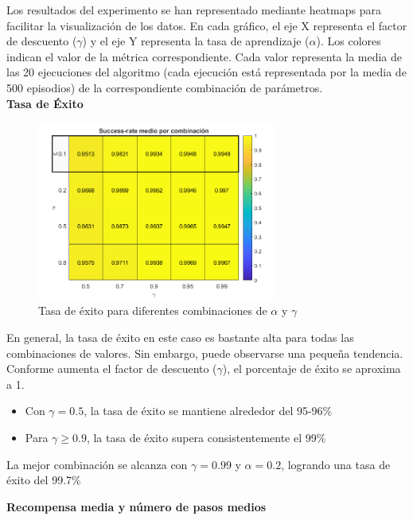 Los resultados del experimento se han representado mediante heatmaps para facilitar la visualización de los datos. En cada gráfico, el eje X representa el factor de descuento ($\gamma$) y el eje Y representa la tasa de aprendizaje ($\alpha$). Los colores indican el valor de la métrica correspondiente. Cada valor representa la media de las 20 ejecuciones del algoritmo (cada ejecución está representada por la media de 500 episodios) de la correspondiente combinación de parámetros. 
\\

\textbf{Tasa de Éxito}

\begin{figure}[H]
    \centering
    \includegraphics[width=0.7\textwidth]{../../experiments/qlearning/experiment-1/results/success.png}
    \caption{Tasa de éxito para diferentes combinaciones de $\alpha$ y $\gamma$}
    \label{fig:qlearning-success}
\end{figure}

En general, la tasa de éxito en este caso es bastante alta para todas las combinaciones de valores. Sin embargo, puede observarse una pequeña tendencia. Conforme aumenta el factor de descuento ($\gamma$), el porcentaje de éxito se aproxima a 1. 

\begin{itemize}
    \item Con $\gamma = 0.5$, la tasa de éxito se mantiene alrededor del 95-96\%
    \item Para $\gamma \geq 0.9$, la tasa de éxito supera consistentemente el 99\%
\end{itemize}

La mejor combinación se alcanza con $\gamma = 0.99$ y $\alpha = 0.2$, logrando una tasa de éxito del 99.7\%

\newpage

\textbf{Recompensa media y número de pasos medios}

